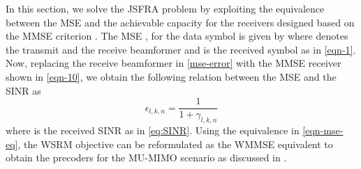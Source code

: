 
In this section, we solve the \ac{JSFRA} problem by exploiting the equivalence between the \ac{MSE} and the achievable capacity for the receivers designed based on the \ac{MMSE} criterion \cite{viswanath1999optimal,mse_duality}. The \ac{MSE} , for the data symbol is given by
\iftoggle{single_column}{
\begin{IEEEeqnarray}{rCl} \label{mse-error}
	\mathbb{E} \big [ ( d_{l,k,n} - \hat{d}_{l,k,n} )^2 \big ] = \left | 1 - \mvec{w}{l,k,n}^\herm \mvec{H}{b_k,k,n} \mvec{m}{l,k,n} \right |^2 + \sum_{\mathclap{(j,i) \neq (l,k)}} \left | \mvec{w}{l,k,n}^\herm \mvec{H}{b_i,i,n} \mvec{m}{j,i,n} \right |^2 + N_0 \, \|\mvec{w}{l,k,n}\|^2 = \epsilon_{l,k,n}
\end{IEEEeqnarray}
}{
\begin{multline} \label{mse-error}
 \mathbb{E} \big [ ( d_{l,k,n} - \hat{d}_{l,k,n} )^2 \big ] = \left | 1 - \mvec{w}{l,k,n}^\herm \mvec{H}{b_k,k,n} \mvec{m}{l,k,n} \right |^2 \\
 + \sum_{\mathclap{(j,i) \neq (l,k)}} \left | \mvec{w}{l,k,n}^\herm \mvec{H}{b_i,i,n} \mvec{m}{j,i,n} \right |^2 + N_0 \, \|\mvec{w}{l,k,n}\|^2 = \epsilon_{l,k,n}
\end{multline}
}
where  denotes the transmit and the receive beamformer and  is the received symbol as in \eqref{eqn-1}. Now, replacing the receive beamformer in \eqref{mse-error} with the \ac{MMSE} receiver shown in \eqref{eqn-10}, we obtain the following relation between the \ac{MSE} and the \ac{SINR} as
\begin{equation} \label{eqn-mse-eq}
\epsilon_{l,k,n} = \frac{1}{1 + \gamma_{l,k,n}}
\end{equation}
where  is the received \ac{SINR} as in \eqref{eq:SINR}. Using the equivalence in \eqref{eqn-mse-eq}, the \ac{WSRM} objective can be reformulated as the \ac{WMMSE} equivalent to obtain the precoders for the \acs{MU}-\acs{MIMO} scenario as discussed in \cite{christensen2008weighted,wmmse_shi,hong2012decomposition}.

